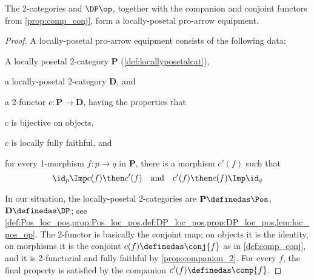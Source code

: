 \begin{theorem}
  The 2-categories \Pos and $\DP\op$, together with the companion and conjoint functors from \cref{prop:comp_conj}, form a locally-posetal pro-arrow equipment.
\end{theorem}
\begin{proof}
  A locally-posetal pro-arrow equipment consists of the following data:
  \begin{compactitem}
    \item A locally posetal 2-category $\mathbf{P}$ (\cref{def:locallyposetalcat}),
    \item a locally-posetal 2-category $\mathbf{D}$, and
    \item a 2-functor $c\colon\mathbf{P}\to\mathbf{D}$, having the properties that
    \begin{compactitem}
      \item $c$ is bijective on objects,
      \item $c$ is locally fully faithful, and
      \item for every 1-morphism $f\colon p\to q$ in $\mathbf{P}$, there is a morphism $c'(f)$ such that
      \begin{equation}
        \id_p\Imp c(f)\then c'(f)\quad\text{and}\quad c'(f)\then c(f)\Imp\id_q
      \end{equation}
    \end{compactitem}
  \end{compactitem}
  In our situation, the locally-posetal 2-categories are $\mathbf{P}\definedas\Pos$, $\mathbf{D}\definedas\DP$; see \cref{def:Pos_loc_pos,prop:Pos_loc_pos,def:DP_loc_pos,prop:DP_loc_pos,lem:loc_pos_op}. The 2-functor is basically the conjoint map; on objects it is the identity, on morphisms it is the conjoint $c(f)\definedas\conj{f}$ as in \cref{def:comp_conj}, and it is 2-functorial and fully faithful by \cref{prop:companion_2}. For every $f$, the final property is satisfied by the companion $c'(f)\definedas \comp{f}$.
\end{proof}


